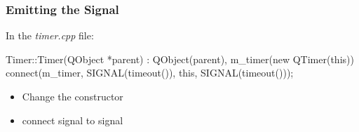 
\begin{slide}[fragile]\frametitle{Emitting the Signal}

In the \textit{timer.cpp} file:

\vspace*{0.5em}
\begin{cpp}
Timer::Timer(QObject *parent)
    : QObject(parent),
      m_timer(new QTimer(this))
{
    connect(m_timer, SIGNAL(timeout()),
            this, SIGNAL(timeout()));
}
\end{cpp}

\begin{itemize}
\item Change the constructor
\item connect  signal to  signal
\end{itemize}

\end{slide}




